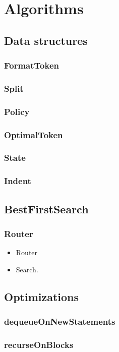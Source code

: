 \section{Algorithms}\label{sec:algorithms}
\subsection{Data structures}
\subsubsection{FormatToken}
\subsubsection{Split}
\subsubsection{Policy}
\subsubsection{OptimalToken}
\subsubsection{State}
\subsubsection{Indent}
\subsection{BestFirstSearch}
\subsubsection{Router}
\begin{itemize}
  \item Router
  \item Search.
\end{itemize}
\subsection{Optimizations}
\subsubsection{dequeueOnNewStatements}
\subsubsection{recurseOnBlocks}
